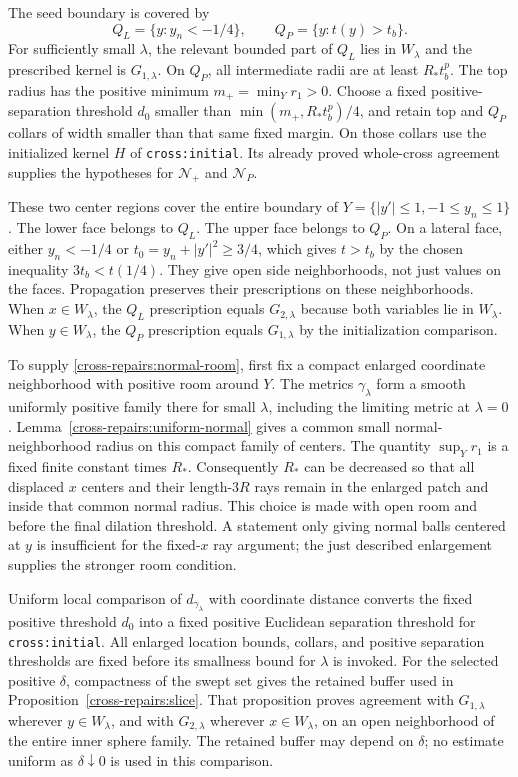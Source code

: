 \documentclass[11pt]{article}
\theoremstyle{definition}
\theoremstyle{remark}
\numberwithin{equation}{section}
\begin{document}
The seed boundary is covered by
\[
 Q_L=\{y:y_n<-1/4\},\qquad Q_P=\{y:t(y)>t_b\}.
\]
For sufficiently small $\lambda$, the relevant bounded part of $Q_L$
lies in $W_\lambda$ and the prescribed kernel is $G_{1,\lambda}$.
On $Q_P$, all intermediate radii are at least $R_*t_b^p$.
The top radius has the positive minimum
$m_+=\min_Yr_1>0$.
Choose a fixed positive-separation threshold $d_0$ smaller than
$\min(m_+,R_*t_b^p)/4$, and retain top and $Q_P$ collars of width
smaller than that same fixed margin. On those collars use the
initialized kernel $H$ of \texttt{cross:initial}.
Its already proved whole-cross agreement supplies the hypotheses for
$\mathcal N_+$ and $\mathcal N_P$.

These two center regions cover the entire boundary of
$Y=\{|y'|\le1,-1\le y_n\le1\}$.
The lower face belongs to $Q_L$. The upper face belongs to $Q_P$.
On a lateral face, either $y_n<-1/4$ or
$t_0=y_n+|y'|^2\ge3/4$, which gives $t>t_b$ by the chosen
inequality $3t_b<t(1/4)$.
They give open side neighborhoods, not just values on the faces.
Propagation preserves their prescriptions on these neighborhoods.
When $x\in W_\lambda$, the $Q_L$ prescription equals $G_{2,\lambda}$
because both variables lie in $W_\lambda$.
When $y\in W_\lambda$, the $Q_P$ prescription equals
$G_{1,\lambda}$ by the initialization comparison.

To supply \eqref{cross-repairs:normal-room}, first fix a compact enlarged
coordinate neighborhood with positive room around $Y$.
The metrics $\gamma_\lambda$ form a smooth uniformly positive family
there for small $\lambda$, including the limiting metric at $\lambda=0$.
Lemma~\ref{cross-repairs:uniform-normal} gives a common small
normal-neighborhood radius on this compact family of centers.
The quantity $\sup_Yr_1$ is a fixed finite constant times $R_*$.
Consequently $R_*$ can be decreased so that all displaced $x$ centers
and their length-$3R$ rays remain in the enlarged patch and inside
that common normal radius. This choice is made with open room and
before the final dilation threshold. A statement only giving normal
balls centered at $y$ is insufficient for the fixed-$x$ ray argument;
the just described enlargement supplies the stronger room condition.

Uniform local comparison of $d_{\gamma_\lambda}$ with coordinate
distance converts the fixed positive threshold $d_0$ into a fixed
positive Euclidean separation threshold for \texttt{cross:initial}.
All enlarged location bounds, collars, and positive separation thresholds
are fixed before its smallness bound for $\lambda$ is invoked.
For the selected positive $\delta$, compactness of the swept set gives
the retained buffer used in Proposition~\ref{cross-repairs:slice}.
That proposition proves agreement with $G_{1,\lambda}$ wherever
$y\in W_\lambda$, and with $G_{2,\lambda}$ wherever $x\in W_\lambda$,
on an open neighborhood of the entire inner sphere family.
The retained buffer may depend on $\delta$; no estimate uniform as
$\delta\downarrow0$ is used in this comparison.
\end{document}
